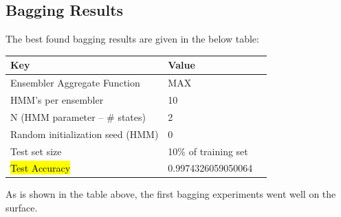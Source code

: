 \documentclass[12pt]{article}
\begin{document}
\subsection{Bagging Results}
  The best found bagging results are given in the below table:
  \begin{table}[H]
    \centering
  \begin{tabular}{|l|l|l|}
    \hline \textbf{Key} & \textbf{Value} \\\hline \hline
    Ensembler Aggregate Function & \textsc{MAX}  \\ \hline
    HMM's per ensembler & 10 \\ \hline
    N (HMM parameter -- \# states) & 2 \\ \hline
    Random initialization seed (HMM) & 0 \\ \hline
    Test set size  & 10\% of training set \\ \hline
  \hl{Test Accuracy} & 0.9974326059050064  \\ \hline
  \end{tabular}
  \end{table}  
  As is shown in the table above, the first bagging experiments went well on the surface. 
\end{document}
